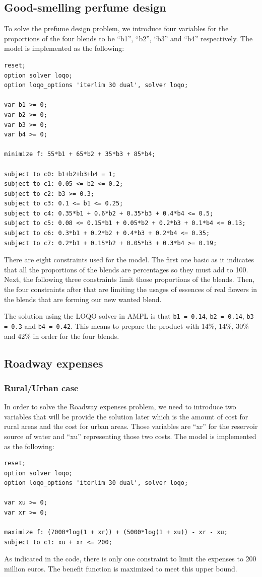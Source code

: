 \subsection{Good-smelling perfume design}
To solve the prefume design problem, we introduce four variables for the proportions of the four blends to be ``b1'', ``b2'', ``b3'' and ``b4'' respectively. The model is implemented as the following:
\begin{verbatim}
reset;
option solver loqo;
option loqo_options 'iterlim 30 dual', solver loqo;

var b1 >= 0;
var b2 >= 0;
var b3 >= 0;
var b4 >= 0;

minimize f: 55*b1 + 65*b2 + 35*b3 + 85*b4;

subject to c0: b1+b2+b3+b4 = 1;
subject to c1: 0.05 <= b2 <= 0.2;
subject to c2: b3 >= 0.3;
subject to c3: 0.1 <= b1 <= 0.25;
subject to c4: 0.35*b1 + 0.6*b2 + 0.35*b3 + 0.4*b4 <= 0.5;
subject to c5: 0.08 <= 0.15*b1 + 0.05*b2 + 0.2*b3 + 0.1*b4 <= 0.13;
subject to c6: 0.3*b1 + 0.2*b2 + 0.4*b3 + 0.2*b4 <= 0.35;
subject to c7: 0.2*b1 + 0.15*b2 + 0.05*b3 + 0.3*b4 >= 0.19;
\end{verbatim}
There are eight constraints used for the model. The first one basic as it indicates that all the proportions of the blends are percentages so they must add to 100. Next, the following three constraints limit those proportions of the blends. Then, the four constraints after that are limiting the usages of essences of real flowers in the blends that are forming our new wanted blend.

The solution using the LOQO solver in AMPL is that \texttt{b1 = 0.14}, \texttt{b2 = 0.14}, \texttt{b3 = 0.3} and \texttt{b4 = 0.42}. This means to prepare the product with 14\%, 14\%, 30\% and 42\% in order for the four blends.

\subsection{Roadway expenses}
\subsubsection{Rural/Urban case}
In order to solve the Roadway expenses problem, we need to introduce two variables that will be provide the solution later which is the amount of cost for rural areas and the cost for urban areas. Those variables are ``xr'' for the reservoir source of water and ``xu'' representing those two costs. The model is implemented as the following:
\begin{verbatim}
reset;
option solver loqo;
option loqo_options 'iterlim 30 dual', solver loqo;

var xu >= 0;
var xr >= 0;

maximize f: (7000*log(1 + xr)) + (5000*log(1 + xu)) - xr - xu;
subject to c1: xu + xr <= 200;
\end{verbatim}
As indicated in the code, there is only one constraint to limit the expenses to 200 million euros. The benefit function is maximized to meet this upper bound.

